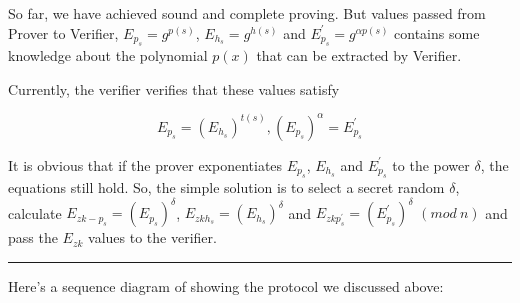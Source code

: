 \documentclass[
]{report}
\begin{document}
So far, we have achieved sound and complete proving. But values passed
from Prover to Verifier, \(E_{p_{s}} = g^{p(s)}\),
\(E_{h_{s}} = g^{h(s)}\) and \(E_{p_{s}}^{'} = g^{\alpha p(s)}\)
contains some knowledge about the polynomial \(p(x)\) that can be
extracted by Verifier.

Currently, the verifier verifies that these values satisfy

\[E_{p_{s}} = \left( E_{h_{s}} \right)^{t(s)},\left( E_{p_{s}} \right)^{\alpha} = E_{p_{s}}^{'}\]

It is obvious that if the prover exponentiates \(E_{p_{s}}\),
\(E_{h_{s}}\) and \(E_{p_{s}}^{'}\) to the power \(\delta\), the
equations still hold. So, the simple solution is to select a secret
random \(\delta\), calculate
\(E_{zk - p_{s}} = \left( E_{p_{s}} \right)^{\delta}\),
\(E_{zkh_{s}} = \left( E_{h_{s}} \right)^{\delta}\) and
\(E_{zkp_{s}^{'}} = \left( E_{p_{s}}^{'} \right)^{\delta}\) \((mod\ n)\)
and pass the \(E_{zk}\) values to the verifier.

\begin{center}\rule{0.5\linewidth}{0.5pt}\end{center}

Here's a sequence diagram of showing the protocol we discussed
above:
\end{document}
